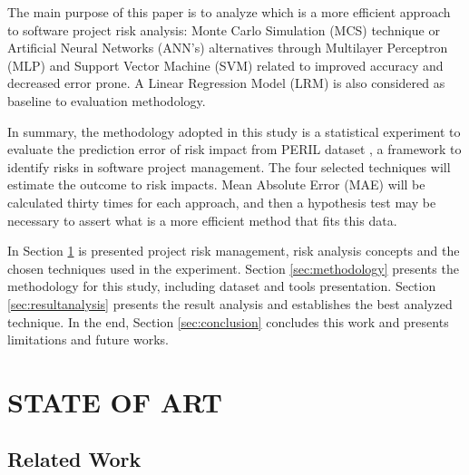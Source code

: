 \documentclass[a4paper,twoside]{article}
\begin{document}
The main purpose of this paper is to analyze which is a more efficient approach to software project risk analysis: Monte Carlo Simulation (MCS) technique or Artificial Neural Networks (ANN's) alternatives through Multilayer Perceptron (MLP) and Support Vector Machine (SVM) related to improved accuracy and decreased error prone. A Linear Regression Model (LRM) is also considered as baseline to evaluation methodology.

In summary, the methodology adopted in this study is a statistical experiment to evaluate the prediction error of risk impact from PERIL dataset \cite{kendrick2003identifying}, a framework to identify risks in software project management. The four selected techniques will estimate the outcome to risk impacts. Mean Absolute Error (MAE) will be calculated thirty times for each approach, and then a hypothesis test may be necessary to assert what is a more efficient method that fits this data.

In Section \ref{sec:stateofart} is presented project risk management, risk analysis concepts and the chosen techniques used in the experiment. Section \ref{sec:methodology} presents the methodology for this study, including dataset and tools presentation. Section \ref{sec:resultanalysis} presents the result analysis and establishes the best analyzed technique. In the end, Section \ref{sec:conclusion} concludes this work and presents limitations and future works.

\section{\uppercase{State of Art}}
\label{sec:stateofart}

\subsection{Related Work}
\end{document}
